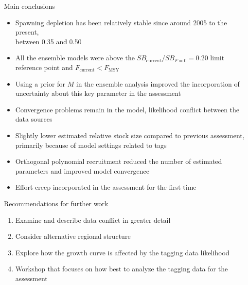 \documentclass[aspectratio=169]{beamer}
\begin{document}
\begin{frame}{Main conclusions}\small
  \vspace{-1ex}
  \begin{itemize}
    \item Spawning depletion has been relatively stable since around 2005 to the
    present,\\
    between 0.35 and 0.50\\[1.5ex]
    \item All the ensemble models were above the
    $SB_\mathrm{current}/SB_{F=0}=0.20$ limit\\
    reference point and $F_\mathrm{current}<F_\mathrm{MSY}$
    \item Using a prior for $M$ in the ensemble analysis improved the
    incorporation of\\
    uncertainty about this key parameter in the assessment\\[1.5ex]
    \item Convergence problems remain in the model, likelihood conflict between
    the\\
    data sources\\[1.5ex]
    \item Slightly lower estimated relative stock size compared to previous
    assessment,\\
    primarily because of model settings related to tags\\[1.5ex]
    \item Orthogonal polynomial recruitment reduced the number of estimated\\
    parameters and improved model convergence\\[1.5ex]
    \item Effort creep incorporated in the assessment for the first
    time\\[1.5ex]
  \end{itemize}
\end{frame}


\begin{frame}{Recommendations for further work}\small
  \vspace{-1ex}
  \begin{enumerate}
    \item Examine and describe data conflict in greater detail\\[3ex]
    \item Consider alternative regional structure\\[3ex]
    \item Explore how the growth curve is affected by the tagging data
    likelihood\\[3ex]
    \item Workshop that focuses on how best to analyze the tagging data for the
    assessment\\[3ex]
  \end{enumerate}
\end{frame}
\end{document}
